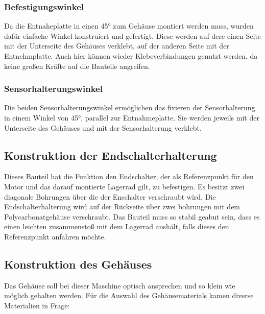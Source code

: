\subsubsection{Befestigungswinkel}
Da die Entnaheplatte in einen 45° zum Gehäuse montiert werden muss, wurden dafür einfache Winkel konstruiert und gefertigt.
Diese werden auf dere einen Seite mit der Unterseite des Gehäuses verklebt, auf der anderen Seite mit der Entnehmplatte.
Auch hier können wieder Klebeverbindungen genutzt werden, da keine großen Kräfte auf die Bauteile angreifen.

\subsubsection{Sensorhalterungswinkel}
Die beiden Sensorhalterungswinkel ermöglichen das fixieren der Sensorhalterung in einem Winkel von 45°, parallel zur
Entnahmeplatte. Sie werden jeweils mit der Unterseite des Gehäuses und mit der Sensorhalterung verklebt.

\subsection{Konstruktion der Endschalterhalterung}
Dieses Bauteil hat die Funktion den Endschalter, der als Referenzpunkt für den Motor und das darauf montierte
Lagerrad gilt, zu befestigen. Es besitzt zwei diagonale Bohrungen über die der Enschalter verschraubt wird.
Die Endschalterhalterung wird auf der Rückseite über zwei bohrungen mit dem Polycarbonatgehäuse verschraubt.
Das Bauteil muss so stabil geabut sein, dass es einen leichten zusammenstoß mit dem  Lagerrad aushält, falls dieses
den Referenzpunkt anfahren möchte.

\subsection{Konstruktion des Gehäuses}
Das Gehäuse soll bei dieser Maschine optisch ansprechen und so klein wie möglich gehalten werden. Für die Auswahl
des Gehäusematerials kamen diverse Materialien in Frage:

